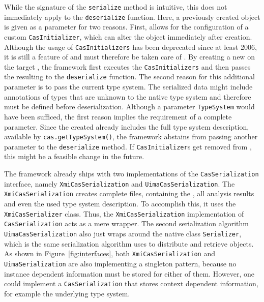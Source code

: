 While the signature of the \lstinline|serialize| method is intuitive, this does not immediately apply to the \lstinline|deserialize| function. Here, a previously created \cas{} object is given as a parameter for two reasons. First, \uima{} allows for the configuration of a custom \lstinline|CasInitializer|, which can alter the \cas{} object immediately after creation. Although the usage of \lstinline|CasInitializers| has been deprecated since at least 2006, it is still a feature of \uima{} and must therefore be taken care of \cite{uimacpe}. By creating a new \cas{} on the target \jvm{}, the framework first executes the \lstinline|CasInitializers| and then passes the resulting \cas{} to the \lstinline|deserialize| function. The second reason for this additional parameter is to pass the current \uima{} type system. The serialized data might include annotations of types that are unknown to the native \uima{} type system and therefore must be defined before deserialization. Although a parameter \lstinline|TypeSystem| would have been sufficed, the first reason implies the requirement of a complete \cas{} parameter. Since the created \cas{} already includes the full type system description, available by \lstinline|cas.getTypeSystem()|, the framework abstains from passing another parameter to the \lstinline|deserialize| method. If \lstinline|CasInitializer|s get removed from \uima{}, this might be a feasible change in the future.

The framework already ships with two implementations of the \lstinline|CasSerialization| interface, namely \lstinline|XmiCasSerialization| and \lstinline|UimaCasSerialization|. The \lstinline|XmiCasSerialization| creates complete \xmi{} files, containing the \sofa{}, all analysis results and even the used type system description. To accomplish this, it uses the \uima{} \lstinline|XmiCasSerializer| class. Thus, the \lstinline|XmiCasSerialization| implementation of \lstinline|CasSerialization| acts as a mere wrapper. The second serialization algorithm \lstinline|UimaCasSerialization| also just wraps around the native \uima{} class \lstinline|Serializer|, which is the same serialization algorithm \uimaas{} uses to distribute and retrieve \cas{} objects. As shown in Figure~\ref{fig:interfaces}, both \lstinline|XmiCasSerialization| and \lstinline|UimaSerialization| are also implementing a singleton pattern, because no instance dependent information must be stored for either of them. However, one could implement a \lstinline|CasSerialization| that stores context dependent information, for example the underlying type system.

